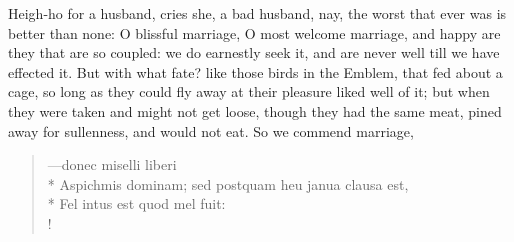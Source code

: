 Heigh-ho for a husband, cries she, a bad husband, nay, the worst that
ever was is better than none: O blissful marriage, O most welcome
marriage, and happy are they that are so coupled: we do earnestly seek
it, and are never well till we have effected it. But with what fate?
like those birds in the Emblem, that fed about a cage, so long as
they could fly away at their pleasure liked well of it; but when they
were taken and might not get loose, though they had the same meat,
pined away for sullenness, and would not eat. So we commend marriage,
%
\begin{latin}
\begin{verse}%
---donec miselli liberi\\*
Aspichmis dominam; sed postquam heu janua clausa est,\\*
Fel intus est quod mel fuit:\\!
\end{verse}%
\end{latin}

